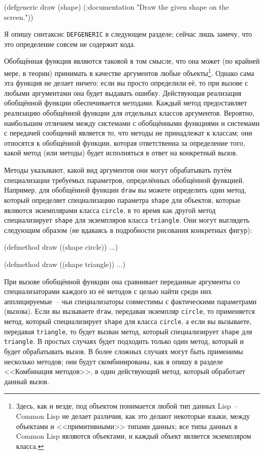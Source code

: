 \begin{myverb}
(defgeneric draw (shape)
  (:documentation "Draw the given shape on the screen."))
\end{myverb}

Я опишу синтаксис \lstinline{DEFGENERIC} в следующем разделе; сейчас лишь замечу, что это
определение совсем не содержит кода.

Обобщённая функция являются таковой в том смысле, что она может (по крайней мере, в теории)
принимать в качестве аргументов любые объекты\footnote{Здесь, как и везде, под объектом
  понимается любой тип данных Lisp~-- Common Lisp не делает различия, как это делают
  некоторые языки, между объектами и <<примитивными>> типами данных; все типы данных в
  Common Lisp являются объектами, и каждый объект является экземпляром класса.}.  Однако
сама эта функция не делает ничего; если вы просто определили её, то при вызове с любыми
аргументами она будет выдавать ошибку. Действующая реализация обобщённой функции
обеспечивается методами. Каждый метод предоставляет реализацию обобщённой функции для
отдельных классов аргументов.  Вероятно, наибольшим отличием между системами с обобщёнными
функциями и системами с передачей сообщений является то, что методы не принадлежат к
классам; они относятся к обобщённой функции, которая ответственна за определение того,
какой метод (или методы) будет исполняться в ответ на конкретный вызов.

Методы указывают, какой вид аргументов они могут обрабатывать путём специализации
требуемых параметров, определённых обобщённой функцией.  Например, для обобщённой функции
\lstinline{draw} вы можете определить один метод, который определяет специализацию параметра
\lstinline{shape} для объектов, которые являются экземплярами класса \lstinline{circle}, в то время
как другой метод специализирует \lstinline{shape} для экземпляров класса \lstinline{triangle}.  Они
могут выглядеть следующим образом (не вдаваясь в подробности рисования конкретных фигур):

\begin{myverb}
(defmethod draw ((shape circle))
  ...)

(defmethod draw ((shape triangle))
  ...)
\end{myverb}

При вызове обобщённой функции она сравнивает переданные аргументы со спе\-циа\-ли\-за\-то\-ра\-ми
каждого из её методов с целью найти среди них апплицируемые~-- чьи специализаторы
совместимы с фактическими параметрами (вызова). Если вы вы\-зы\-вае\-те \lstinline{draw}, передавая
экземпляр \lstinline{circle}, то применяется метод, который специализирует \lstinline{shape} для
класса \lstinline{circle}, а если вы вызываете, передавая \lstinline{triangle}, то будет вызван
метод, который специализирует \lstinline{shape} для \lstinline{triangle}.  В простых случаях будет
подходить только один метод, который и будет обрабатывать вызов.  В более сложных случаях
могут быть применимы несколько методов; они будут скомбинированы, как я опишу в разделе
<<Комбинация методов>>, в один действующий метод, который обработает данный вызов.

